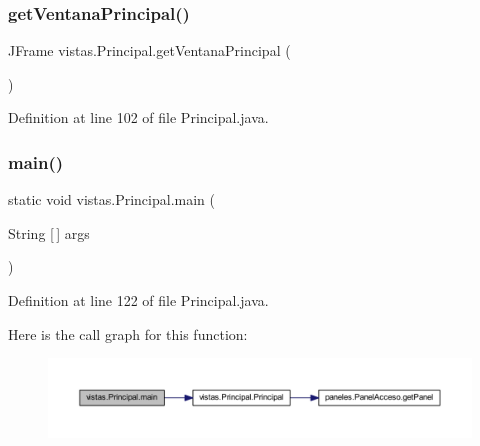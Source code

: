 \mbox{\label{classvistas_1_1_principal_afc2c81827c88c9c2494b3345264e747d}} 
\subsubsection{\texorpdfstring{get\+Ventana\+Principal()}{getVentanaPrincipal()}}
{\footnotesize\ttfamily J\+Frame vistas.\+Principal.\+get\+Ventana\+Principal (\begin{DoxyParamCaption}{ }\end{DoxyParamCaption})}



Definition at line 102 of file Principal.\+java.

\mbox{\label{classvistas_1_1_principal_a626dbf26bfdd3a03a2c1c99e34d25b6c}} 
\subsubsection{\texorpdfstring{main()}{main()}}
{\footnotesize\ttfamily static void vistas.\+Principal.\+main (\begin{DoxyParamCaption}\item[{String \mbox{[}$\,$\mbox{]}}]{args }\end{DoxyParamCaption})\hspace{0.3cm}{\ttfamily [static]}}



Definition at line 122 of file Principal.\+java.

Here is the call graph for this function\+:\nopagebreak
\begin{figure}[H]
\begin{center}
\leavevmode
\includegraphics[width=350pt]{classvistas_1_1_principal_a626dbf26bfdd3a03a2c1c99e34d25b6c_cgraph}
\end{center}
\end{figure}
\mbox{\label{classvistas_1_1_principal_a6f45e56ee7c99715b798ff202bd57d7e}} 
